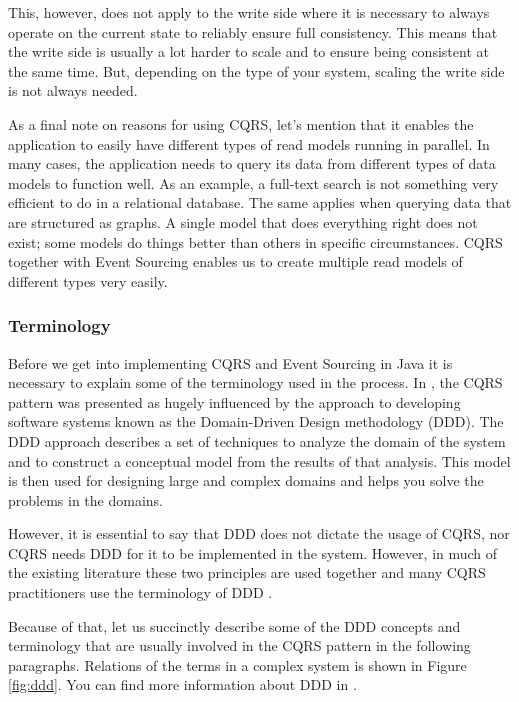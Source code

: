 \documentclass{book}
\begin{document}
This, however, does not apply to the write side where it is necessary to
always operate on the current state to reliably ensure full consistency.
This means that the write side is usually a lot harder to scale and to
ensure being consistent at the same time. But, depending on the type of
your system, scaling the write side is not always needed.

As a final note on reasons for using CQRS, let's mention that it enables
the application to easily have different types of read models running in
parallel. In many cases, the application needs to query its data from
different types of data models to function well. As an example, a
full-text search is not something very efficient to do in a relational
database. The same applies when querying data that are structured as
graphs. A single model that does everything right does not exist; some
models do things better than others in specific circumstances. CQRS
together with Event Sourcing enables us to create multiple read models
of different types very easily.

\subsubsection{Terminology}\label{terminology}

Before we get into implementing CQRS and Event Sourcing in Java it is
necessary to explain some of the terminology used in the process. In
\cite{journey}, the CQRS pattern was presented as hugely influenced by
the approach to developing software systems known as the Domain-Driven
Design methodology (DDD). The DDD approach describes a set of techniques
to analyze the domain of the system and to construct a conceptual model
from the results of that analysis. This model is then used for designing
large and complex domains and helps you solve the problems in the
domains.

However, it is essential to say that DDD does not dictate the usage of
CQRS, nor CQRS needs DDD for it to be implemented in the system.
However, in much of the existing literature these two principles are
used together and many CQRS practitioners use the terminology of DDD
\cite{journey}.

Because of that, let us succinctly describe some of the DDD concepts and
terminology that are usually involved in the CQRS pattern in the
following paragraphs. Relations of the terms in a complex system is
shown in Figure \ref{fig:ddd}. You can find more information about DDD
in \cite{ddd}.
\end{document}

